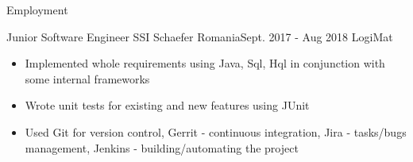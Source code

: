 \documentclass[]{mcdowellcv}
\begin{document}
	\makeheader
	
	\begin{cvsection}{Employment}
		\begin{cvsubsection}{Junior Software Engineer }{SSI Schaefer Romania}{Sept. 2017 - Aug 2018}
			LogiMat
			\begin{itemize}
				\item Implemented whole requirements using Java, Sql, Hql in conjunction with some internal frameworks
				\item Wrote unit tests for existing and new features using JUnit 
				\item Used Git for version control, Gerrit - continuous integration, Jira - tasks/bugs management, \linebreak 
						Jenkins - building/automating the project  
			\end{itemize}
		\end{cvsubsection}
		
	\end{cvsection}
	
\end{document}

